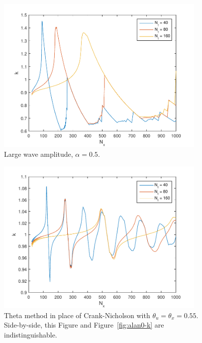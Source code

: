 \documentclass{article}
\begin{document}
\begin{figure}[htbp]
\centering
  \includegraphics[width=0.9\textwidth]{alan2-k.pdf}
  \caption{Large wave amplitude, $\alpha = 0.5$.
  \label{fig:alan2-k}}
\end{figure}
\begin{figure}[hbtp]
\centering
  \includegraphics[width=0.9\textwidth]{alan3-k.pdf}
  \caption{Theta method in place of Crank-Nicholson with $\theta_u = \theta_x = 0.55$.
    Side-by-side, this Figure and Figure~\ref{fig:alan0-k} are indistinguishable.
  \label{fig:alan3-k}}
\end{figure}
\end{document}
